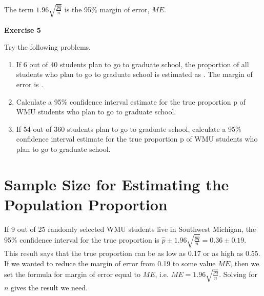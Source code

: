 \documentclass[11pt]{book}\usepackage[]{graphicx}\usepackage[]{color}
\begin{document}

The term $1.96 \sqrt{\frac{\hat{p} \hat{q}}{n}}$ is the 95\% margin of error, $ME$.

\begin{minipage}[ht]{29mm}

\vspace{-20mm}

\textbf{Exercise 5}

\end{minipage}
\begin{minipage}[ht]{109mm}

{\parbox{108mm}{
Try the following problems.

\begin{enumerate}
\item If 6 out of 40 students plan to go to graduate school, the proportion of all students who plan to go to graduate school is estimated as \underline{\phantom{xxxxxxxxxx}}.  The margin of error is \underline{\phantom{xxxxxxxxxx}}.
\item Calculate a 95\% confidence interval estimate for the true proportion p of WMU students who plan to go to graduate school.
\item If 54 out of 360 students plan to go to graduate school, calculate a 95\% confidence interval estimate for the true proportion p of WMU students who plan to go to graduate school.
\end{enumerate}
}}

\end{minipage}

\section{Sample Size for Estimating the Population Proportion}

If 9 out of 25 randomly selected WMU students live in Southwest Michigan, the 95\% confidence interval for the true proportion is $\hat{p} \pm 1.96 \sqrt{\frac{\hat{p} \hat{q}}{n}} = 0.36 \pm 0.19$.  This result says that the true proportion can be as low as 0.17 or as high as 0.55.  If we wanted to reduce the margin of error from 0.19 to some value $ME$, then we set the formula for margin of error equal to $ME$, i.e. $ME = 1.96 \sqrt{\frac{\hat{p} \hat{q}}{n}}$.  Solving for $n$ gives the result we need.
\end{document}
